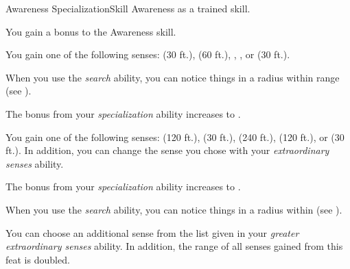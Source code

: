     \begin{feat}{Awareness Specialization}{Skill}
        \featpre Awareness as a trained skill.

         You gain a  bonus to the Awareness skill.

         You gain one of the following senses:  (30 ft.),  (60 ft.), , , or  (30 ft.).

         When you use the \textit{search} ability, you can notice things in a \areasmall radius within \rngshort range (see ).

         The bonus from your \textit{specialization} ability increases to .

         You gain one of the following senses:  (120 ft.),  (30 ft.),  (240 ft.),  (120 ft.), or  (30 ft.).
        In addition, you can change the sense you chose with your \textit{extraordinary senses} ability.

         The bonus from your \textit{specialization} ability increases to .

         When you use the \textit{search} ability, you can notice things in a \medarea radius within \medrange (see ).

         You can choose an additional sense from the list given in your \textit{greater extraordinary senses} ability.
        In addition, the range of all senses gained from this feat is doubled.
    \end{feat}

